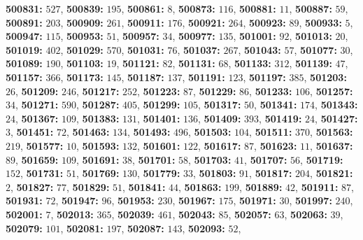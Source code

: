 \textsf{\bfseries 500831:} $527$, \textsf{\bfseries 500839:} $195$, \textsf{\bfseries 500861:} $8$, \textsf{\bfseries 500873:} $116$, \textsf{\bfseries 500881:} $11$, \textsf{\bfseries 500887:} $59$, \textsf{\bfseries 500891:} $203$, \textsf{\bfseries 500909:} $261$, \textsf{\bfseries 500911:} $176$, \textsf{\bfseries 500921:} $264$, \textsf{\bfseries 500923:} $89$, \textsf{\bfseries 500933:} $5$, \textsf{\bfseries 500947:} $115$, \textsf{\bfseries 500953:} $51$, \textsf{\bfseries 500957:} $34$, \textsf{\bfseries 500977:} $135$, \textsf{\bfseries 501001:} $92$, \textsf{\bfseries 501013:} $20$, \textsf{\bfseries 501019:} $402$, \textsf{\bfseries 501029:} $570$, \textsf{\bfseries 501031:} $76$, \textsf{\bfseries 501037:} $267$, \textsf{\bfseries 501043:} $57$, \textsf{\bfseries 501077:} $30$, \textsf{\bfseries 501089:} $190$, \textsf{\bfseries 501103:} $19$, \textsf{\bfseries 501121:} $82$, \textsf{\bfseries 501131:} $68$, \textsf{\bfseries 501133:} $312$, \textsf{\bfseries 501139:} $47$, \textsf{\bfseries 501157:} $366$, \textsf{\bfseries 501173:} $145$, \textsf{\bfseries 501187:} $137$, \textsf{\bfseries 501191:} $123$, \textsf{\bfseries 501197:} $385$, \textsf{\bfseries 501203:} $26$, \textsf{\bfseries 501209:} $246$, \textsf{\bfseries 501217:} $252$, \textsf{\bfseries 501223:} $87$, \textsf{\bfseries 501229:} $86$, \textsf{\bfseries 501233:} $106$, \textsf{\bfseries 501257:} $34$, \textsf{\bfseries 501271:} $590$, \textsf{\bfseries 501287:} $405$, \textsf{\bfseries 501299:} $105$, \textsf{\bfseries 501317:} $50$, \textsf{\bfseries 501341:} $174$, \textsf{\bfseries 501343:} $24$, \textsf{\bfseries 501367:} $109$, \textsf{\bfseries 501383:} $131$, \textsf{\bfseries 501401:} $136$, \textsf{\bfseries 501409:} $393$, \textsf{\bfseries 501419:} $24$, \textsf{\bfseries 501427:} $3$, \textsf{\bfseries 501451:} $72$, \textsf{\bfseries 501463:} $134$, \textsf{\bfseries 501493:} $496$, \textsf{\bfseries 501503:} $104$, \textsf{\bfseries 501511:} $370$, \textsf{\bfseries 501563:} $219$, \textsf{\bfseries 501577:} $10$, \textsf{\bfseries 501593:} $132$, \textsf{\bfseries 501601:} $122$, \textsf{\bfseries 501617:} $87$, \textsf{\bfseries 501623:} $11$, \textsf{\bfseries 501637:} $89$, \textsf{\bfseries 501659:} $109$, \textsf{\bfseries 501691:} $38$, \textsf{\bfseries 501701:} $58$, \textsf{\bfseries 501703:} $41$, \textsf{\bfseries 501707:} $56$, \textsf{\bfseries 501719:} $152$, \textsf{\bfseries 501731:} $51$, \textsf{\bfseries 501769:} $130$, \textsf{\bfseries 501779:} $33$, \textsf{\bfseries 501803:} $91$, \textsf{\bfseries 501817:} $204$, \textsf{\bfseries 501821:} $2$, \textsf{\bfseries 501827:} $77$, \textsf{\bfseries 501829:} $51$, \textsf{\bfseries 501841:} $44$, \textsf{\bfseries 501863:} $199$, \textsf{\bfseries 501889:} $42$, \textsf{\bfseries 501911:} $87$, \textsf{\bfseries 501931:} $72$, \textsf{\bfseries 501947:} $96$, \textsf{\bfseries 501953:} $230$, \textsf{\bfseries 501967:} $175$, \textsf{\bfseries 501971:} $30$, \textsf{\bfseries 501997:} $240$, \textsf{\bfseries 502001:} $7$, \textsf{\bfseries 502013:} $365$, \textsf{\bfseries 502039:} $461$, \textsf{\bfseries 502043:} $85$, \textsf{\bfseries 502057:} $63$, \textsf{\bfseries 502063:} $39$, \textsf{\bfseries 502079:} $101$, \textsf{\bfseries 502081:} $197$, \textsf{\bfseries 502087:} $143$, \textsf{\bfseries 502093:} $52$, 
